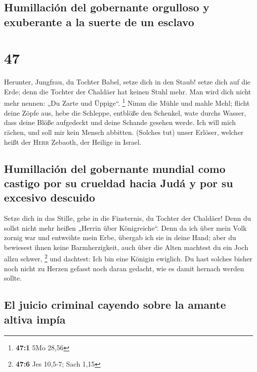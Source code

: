 \hypertarget{humillaciuxf3n-del-gobernante-orgulloso-y-exuberante-a-la-suerte-de-un-esclavo}{%
\subsection{Humillación del gobernante orgulloso y exuberante a la
suerte de un
esclavo}\label{humillaciuxf3n-del-gobernante-orgulloso-y-exuberante-a-la-suerte-de-un-esclavo}}

\hypertarget{section-46}{%
\section{47}\label{section-46}}

 Herunter, Jungfrau, du Tochter Babel, setze dich in den
Staub! setze dich auf die Erde; denn die Tochter der Chaldäer hat keinen
Stuhl mehr. Man wird dich nicht mehr nennen: „Du Zarte und Üppige``.
\footnote{\textbf{47:1} 5Mo 28,56}  Nimm die Mühle und
mahle Mehl; flicht deine Zöpfe aus, hebe die Schleppe, entblöße den
Schenkel, wate durchs Wasser,  dass deine Blöße aufgedeckt
und deine Schande gesehen werde. Ich will mich rächen, und soll mir kein
Mensch abbitten.  (Solches tut) unser Erlöser, welcher
heißt der \textsc{Herr} Zebaoth, der Heilige in Israel.

\hypertarget{humillaciuxf3n-del-gobernante-mundial-como-castigo-por-su-crueldad-hacia-juduxe1-y-por-su-excesivo-descuido}{%
\subsection{Humillación del gobernante mundial como castigo por su
crueldad hacia Judá y por su excesivo
descuido}\label{humillaciuxf3n-del-gobernante-mundial-como-castigo-por-su-crueldad-hacia-juduxe1-y-por-su-excesivo-descuido}}

 Setze dich in das Stille, gehe in die Finsternis, du
Tochter der Chaldäer! Denn du sollst nicht mehr heißen „Herrin über
Königreiche``.  Denn da ich über mein Volk zornig war und
entweihte mein Erbe, übergab ich sie in deine Hand; aber du bewiesest
ihnen keine Barmherzigkeit, auch über die Alten machtest du ein Joch
allzu schwer, \footnote{\textbf{47:6} Jes 10,5-7; Sach 1,15}
 und dachtest: Ich bin eine Königin ewiglich. Du hast
solches bisher noch nicht zu Herzen gefasst noch daran gedacht, wie es
damit hernach werden sollte.

\hypertarget{el-juicio-criminal-cayendo-sobre-la-amante-altiva-impuxeda}{%
\subsection{El juicio criminal cayendo sobre la amante altiva
impía}\label{el-juicio-criminal-cayendo-sobre-la-amante-altiva-impuxeda}}

